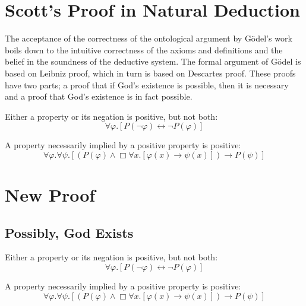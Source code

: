 \documentclass{llncs}
\newcommand{\imp}{\rightarrow}
\newcommand{\biimp}{\leftrightarrow}
\newcommand{\all}{\forall}
\newcommand{\nec}{\Box} %
\begin{document}
\section{Scott's Proof in Natural Deduction}

The acceptance of the correctness of the ontological argument by G\"odel's work boils down to the intuitive correctness of the axioms and definitions and the belief in the soundness of the deductive system. The formal argument of G\"odel is based on Leibniz proof, which in turn is based on Descartes proof. These proofs have two parts; a proof that if God's existence is possible, then it is necessary and a proof that God's existence is in fact possible. 


\begin{axiom}
\label{A1}
Either a property or its negation is positive, but not both:
$$
\all \varphi. [P(\neg \varphi) \biimp \neg P(\varphi)]
$$
\end{axiom}

\begin{axiom}
\label{A2}
A property necessarily implied by a positive property is positive:
$$
\all \varphi. \all \psi.[(P(\varphi) \wedge \nec \all x.[\varphi(x) \imp \psi(x)]) \imp P(\psi)]
$$
\end{axiom}


\section{New Proof}




\subsection{Possibly, God Exists}

\setcounter{axiom}{0}

\begin{axiom}
\label{A1}
Either a property or its negation is positive, but not both:
$$
\all \varphi. [P(\neg \varphi) \biimp \neg P(\varphi)]
$$
\end{axiom}

\begin{axiom}
\label{A2}
A property necessarily implied by a positive property is positive:
$$
\all \varphi. \all \psi.[(P(\varphi) \wedge \nec \all x.[\varphi(x) \imp \psi(x)]) \imp P(\psi)]
$$
\end{axiom}
\end{document}
